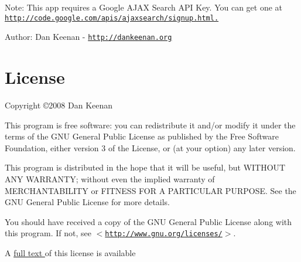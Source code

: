 \begin{Desc}
\item[Note:]This app requires a Google AJAX Search API Key. You can get one at \href{http://code.google.com/apis/ajaxsearch/signup.html.}{\tt http://code.google.com/apis/ajaxsearch/signup.html.}\end{Desc}
\begin{Desc}
\item[Author:]Dan Keenan - \href{http://dankeenan.org}{\tt http://dankeenan.org} \end{Desc}
\hypertarget{index_license}{}\section{License}\label{index_license}
Copyright \copyright 2008 Dan Keenan

This program is free software: you can redistribute it and/or modify it under the terms of the GNU General Public License as published by the Free Software Foundation, either version 3 of the License, or (at your option) any later version.

This program is distributed in the hope that it will be useful, but WITHOUT ANY WARRANTY; without even the implied warranty of MERCHANTABILITY or FITNESS FOR A PARTICULAR PURPOSE. See the GNU General Public License for more details.

You should have received a copy of the GNU General Public License along with this program. If not, see $<$\href{http://www.gnu.org/licenses/}{\tt http://www.gnu.org/licenses/}$>$.



A \hyperlink{license}{full text } of this license is available 